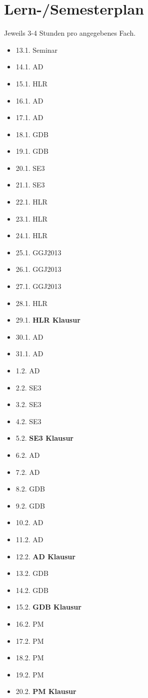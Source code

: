 \documentclass[a4paper,12pt]{scrartcl}
\begin{document}
\newpage
\section{Lern-/Semesterplan}

Jeweils 3-4 Stunden pro angegebenes Fach.

\begin{multicols}{2}
\begin{itemize}
	\item 13.1. Seminar
	\item 14.1. AD
	\item 15.1. HLR
	\item 16.1. AD
	\item 17.1. AD
	\item 18.1. GDB
	\item 19.1. GDB
	\item 20.1. SE3
	\item 21.1. SE3
	\item 22.1. HLR
	\item 23.1. HLR
	\item 24.1. HLR
	\item 25.1. GGJ2013
	\item 26.1. GGJ2013
	\item 27.1. GGJ2013
	\item 28.1. HLR
	\item 29.1. {\textbf{HLR Klausur}}
	\item 30.1. AD
	\item 31.1. AD
	\item 1.2. AD
	\item 2.2. SE3
	\item 3.2. SE3
	\item 4.2. SE3
	\item 5.2. {\textbf{SE3 Klausur}}
	\item 6.2. AD
	\item 7.2. AD
	\item 8.2. GDB
	\item 9.2. GDB
	\item 10.2. AD
	\item 11.2. AD
	\item 12.2. {\textbf{AD Klausur}}
	\item 13.2. GDB
	\item 14.2. GDB
	\item 15.2. {\textbf{GDB Klausur}}
	\item 16.2. PM
	\item 17.2. PM
	\item 18.2. PM
	\item 19.2. PM
	\item 20.2. {\textbf{PM Klausur}}
\end{itemize}
\end{multicols}
\end{document}
